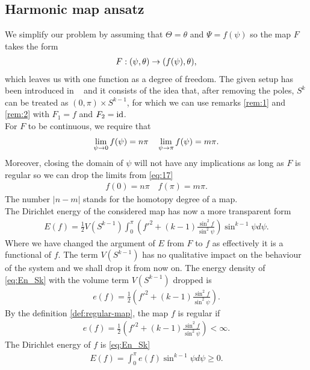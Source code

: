 \subsection{Harmonic map ansatz}
\label{sec:basic-setup}

We simplify our problem by assuming that $\Theta=\theta$ and
$\Psi=f(\psi)$ so the map $F$ takes the form
\begin{align}
  \label{eq:16}
  F:(\psi,\theta)\rightarrow(f(\psi),\theta),
\end{align}
which leaves us with one function as a degree of freedom. The given
setup has been introduced in ~\cite{Eells1964} and it consists of the
idea that, after removing the poles, $S^k$ can be treated as
$(0,\pi)\times S^{k-1}$, for which we can use remarks \ref{rem:1} and
\ref{rem:2} with $F_1=f$ and $F_2=\text{id}$.\\

For $F$ to be continuous, we require that
\begin{align}
  \label{eq:17}
  \lim_{\psi\rightarrow0}f(\psi)=n\pi\quad\lim_{\psi\rightarrow\pi}f(\psi)=m\pi.
\end{align}
Moreover, closing the domain of $\psi$ will not have any implications
as long as $F$ is regular so we can drop the limits from \eqref{eq:17}
\begin{align}
  \label{eq:18}
  f(0)=n\pi\quad f(\pi)=m\pi.
\end{align}
The number $\lvert n-m\rvert$ stands for the homotopy degree of a
map.\\

The Dirichlet energy of the considered map has now a more transparent
form
\begin{align}
  \label{eq:En_Sk}
  E(f)=\frac{1}{2} V(S^{k-1})\int_{0}^{\pi}
  \left(f'^2+(k-1)\frac{\sin^2f}{\sin^2\psi}\right) \sin^{k-1}\psi
  d\psi.
\end{align}
Where we have changed the argument of $E$ from $F$ to $f$ as
effectively it is a functional of $f$. The term $V(S^{k-1})$ has no
qualitative impact on the behaviour of the system and we shall drop it
from now on. The energy density of \eqref{eq:En_Sk} with the volume
term $V(S^{k-1})$ dropped is
\begin{align}
  \label{eq:19}
  e(f)=\frac{1}{2}\left(f'^2+(k-1)\frac{\sin^2f}{\sin^2\psi}\right).
\end{align}
By the definition \ref{def:regular-map}, the map $f$ is regular if
\begin{align}
  \label{eq:20}
  e(f)=\frac{1}{2}\left(f'^2+(k-1)\frac{\sin^2f}{\sin^2\psi}\right)<\infty.
\end{align}
The Dirichlet energy of $f$ is
\eqref{eq:En_Sk}
\begin{align}
  \label{eq:21}
  E(f)=\int_0^\pi e(f)\sin^{k-1}\psi d\psi\ge0.
\end{align}

